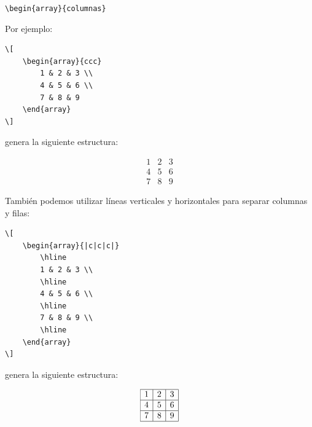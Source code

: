 \documentclass[11pt,a4paper]{article}
\theoremstyle{plain}
\theoremstyle{definition}
\theoremstyle{remark}
\theoremstyle{exercise}
\begin{document}
\begin{center}
    \verb|\begin{array}{columnas}|
\end{center}

\noindent Por ejemplo:

\begin{lstlisting}
\[
    \begin{array}{ccc}
        1 & 2 & 3 \\
        4 & 5 & 6 \\
        7 & 8 & 9
    \end{array}
\]
\end{lstlisting}

\noindent genera la siguiente estructura:

\begin{paginarecuadrada}
\[
    \begin{array}{ccc}
        1 & 2 & 3 \\
        4 & 5 & 6 \\
        7 & 8 & 9
    \end{array}
\]
\end{paginarecuadrada}

\medskip

\noindent También podemos utilizar líneas verticales y horizontales para separar columnas y filas:

\begin{lstlisting}
\[
    \begin{array}{|c|c|c|}
        \hline
        1 & 2 & 3 \\
        \hline
        4 & 5 & 6 \\
        \hline
        7 & 8 & 9 \\
        \hline
    \end{array}
\]
\end{lstlisting}

\noindent genera la siguiente estructura:

\begin{paginarecuadrada}
\[
    \begin{array}{|c|c|c|}
        \hline
        1 & 2 & 3 \\
        \hline
        4 & 5 & 6 \\
        \hline
        7 & 8 & 9 \\
        \hline
    \end{array}
\]
\end{paginarecuadrada}

\medskip
\end{document}

